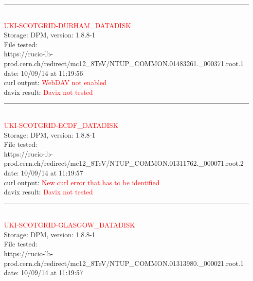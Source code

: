 \rule{\textwidth}{1pt}\\

\textcolor{red}{\normalsize{UKI-SCOTGRID-DURHAM\_DATADISK}}\\

Storage: DPM, version: 1.8.8-1\\

File tested:\\
\footnotesize{https://rucio-lb-prod.cern.ch/redirect/mc12\_8TeV/NTUP\_COMMON.01483261.\_000371.root.1}\\

date: 10/09/14 at 11:19:56\\

curl output:  \textcolor{red}{WebDAV not enabled}\\

davix result:  \textcolor{red}{Davix not tested}\\

\rule{\textwidth}{1pt}\\

\textcolor{red}{\normalsize{UKI-SCOTGRID-ECDF\_DATADISK}}\\

Storage: DPM, version: 1.8.8-1\\

File tested:\\
\footnotesize{https://rucio-lb-prod.cern.ch/redirect/mc12\_8TeV/NTUP\_COMMON.01311762.\_000071.root.2}\\

date: 10/09/14 at 11:19:57\\

curl output:  \textcolor{red}{New curl error that has to be identified}\\

davix result:  \textcolor{red}{Davix not tested}\\

\rule{\textwidth}{1pt}\\

\textcolor{red}{\normalsize{UKI-SCOTGRID-GLASGOW\_DATADISK}}\\

Storage: DPM, version: 1.8.8-1\\

File tested:\\
\footnotesize{https://rucio-lb-prod.cern.ch/redirect/mc12\_8TeV/NTUP\_COMMON.01313980.\_000021.root.1}\\

date: 10/09/14 at 11:19:57\\

